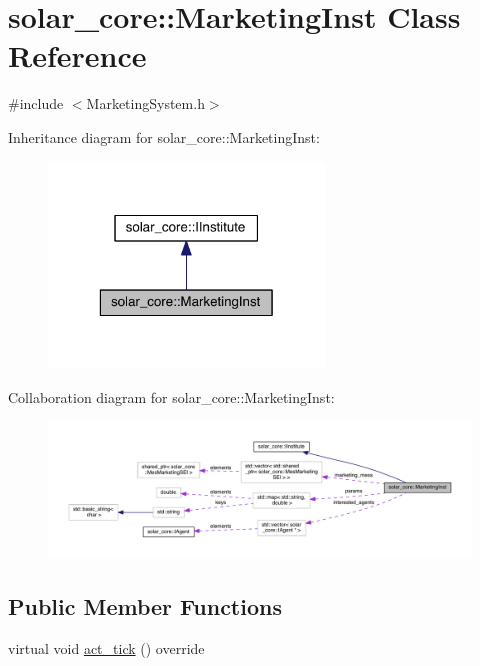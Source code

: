 \hypertarget{classsolar__core_1_1_marketing_inst}{}\section{solar\+\_\+core\+:\+:Marketing\+Inst Class Reference}
\label{classsolar__core_1_1_marketing_inst}


{\ttfamily \#include $<$Marketing\+System.\+h$>$}



Inheritance diagram for solar\+\_\+core\+:\+:Marketing\+Inst\+:\nopagebreak
\begin{figure}[H]
\begin{center}
\leavevmode
\includegraphics[width=208pt]{classsolar__core_1_1_marketing_inst__inherit__graph}
\end{center}
\end{figure}


Collaboration diagram for solar\+\_\+core\+:\+:Marketing\+Inst\+:\nopagebreak
\begin{figure}[H]
\begin{center}
\leavevmode
\includegraphics[width=350pt]{classsolar__core_1_1_marketing_inst__coll__graph}
\end{center}
\end{figure}
\subsection*{Public Member Functions}
\begin{DoxyCompactItemize}
\item 
virtual void \hyperlink{classsolar__core_1_1_marketing_inst_a6ad2e259f3ea536cee2c744ac177d470}{act\+\_\+tick} () override
\end{DoxyCompactItemize}
